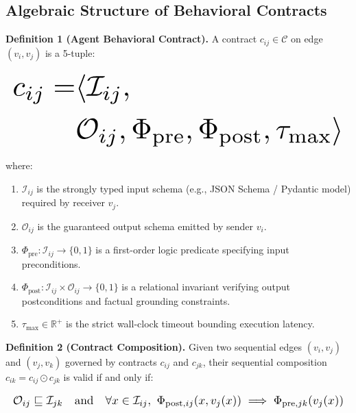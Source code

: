 \documentclass[10pt,twocolumn,letterpaper]{article}
\begin{document}
\subsection{Algebraic Structure of Behavioral Contracts}


\textbf{Definition 1 (Agent Behavioral Contract).} A contract $c_{ij} \in \mathcal{C}$ on edge $(v_i, v_j)$ is a 5-tuple:





\begin{equation}
\resizebox{\columnwidth}{!}{$\displaystyle
\begin{aligned}
c_{ij} = & \langle \mathcal{I}_{ij}, \\
& \mathcal{O}_{ij}, \Phi_{\text{pre}}, \Phi_{\text{post}}, \tau_{\max} \rangle
\end{aligned}
$}
\end{equation}





where:
\begin{enumerate}
  \item $\mathcal{I}_{ij}$ is the strongly typed input schema (e.g., JSON Schema / Pydantic model) required by receiver $v_j$.
  \item $\mathcal{O}_{ij}$ is the guaranteed output schema emitted by sender $v_i$.
  \item $\Phi_{\text{pre}}: \mathcal{I}_{ij} \to \{0, 1\}$ is a first-order logic predicate specifying input preconditions.
  \item $\Phi_{\text{post}}: \mathcal{I}_{ij} \times \mathcal{O}_{ij} \to \{0, 1\}$ is a relational invariant verifying output postconditions and factual grounding constraints.
  \item $\tau_{\max} \in \mathbb{R}^+$ is the strict wall-clock timeout bounding execution latency.
\end{enumerate}

\textbf{Definition 2 (Contract Composition).} Given two sequential edges $(v_i, v_j)$ and $(v_j, v_k)$ governed by contracts $c_{ij}$ and $c_{jk}$, their sequential composition $c_{ik} = c_{ij} \odot c_{jk}$ is valid if and only if:





\begin{equation}
\resizebox{\columnwidth}{!}{$\displaystyle
\begin{aligned}
\mathcal{O}_{ij} \sqsubseteq \mathcal{I}_{jk} \quad \text{and} \quad \forall x \in \mathcal{I}_{ij},\ \Phi_{\text{post}, ij}(x, v_j(x)) \implies \Phi_{\text{pre}, jk}(v_j(x))
\end{aligned}
$}
\end{equation}
\end{document}
